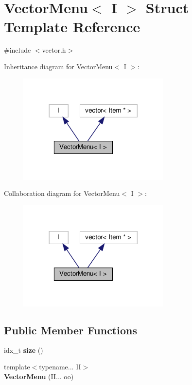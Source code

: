 \hypertarget{structVectorMenu}{}\section{Vector\+Menu$<$ I $>$ Struct Template Reference}
\label{structVectorMenu}


{\ttfamily \#include $<$vector.\+h$>$}



Inheritance diagram for Vector\+Menu$<$ I $>$\+:\nopagebreak
\begin{figure}[H]
\begin{center}
\leavevmode
\includegraphics[width=216pt]{structVectorMenu__inherit__graph}
\end{center}
\end{figure}


Collaboration diagram for Vector\+Menu$<$ I $>$\+:\nopagebreak
\begin{figure}[H]
\begin{center}
\leavevmode
\includegraphics[width=216pt]{structVectorMenu__coll__graph}
\end{center}
\end{figure}
\subsection*{Public Member Functions}
\begin{DoxyCompactItemize}
\item 
\mbox{\label{structVectorMenu_af1df124456c3945b288f7915c6bcfd92}} 
idx\+\_\+t {\bfseries size} ()
\item 
\mbox{\label{structVectorMenu_a0455d0a8f0a5cc620c9d0c70c3ed4cf2}} 
{\footnotesize template$<$typename... II$>$ }\\{\bfseries Vector\+Menu} (I\+I... oo)
\end{DoxyCompactItemize}
